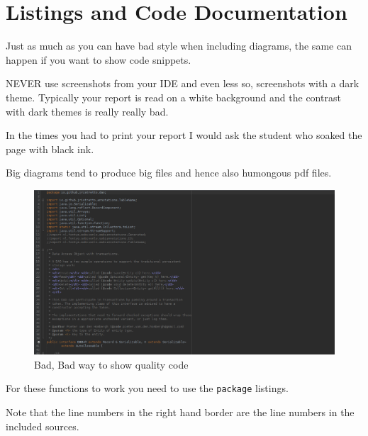 \def\TheFile{ch05_codelisting.tex}
\chapter{Listings and Code Documentation}
\label{chap:listings}
Just as much as you can have bad style when including diagrams, the same can happen if
you want to show code snippets.

\begin{Itemize}
\item {\color{red!60!black}\Huge{}NEVER} use screenshots from your IDE and even less so, screenshots with a dark theme.
  Typically your report is read on a white background and the contrast with dark themes is really really bad.
\item In the times you had to print your report I would ask the student who soaked the page with black ink.
\item Big diagrams tend to produce big files and hence also humongous pdf files.
\end{Itemize}

\begin{figure}
  \caption{Bad, Bad way to show quality code}
  \includegraphics[width=\textwidth]{images/dao.png}
\end{figure}

For these functions to work you need to use the \texttt{package} listings.


Note that the line numbers in the right hand border are the line
numbers in the included sources.



